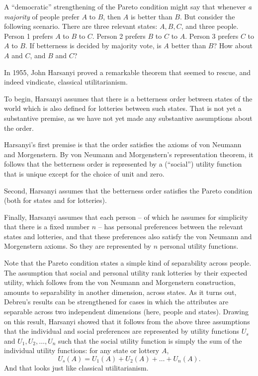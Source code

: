 \begin{exercise}
  A ``democratic'' strengthening of the Pareto condition might say
  that whenever \emph{a majority} of people prefer $A$ to $B$, then
  $A$ is better than $B$. But consider the following scenario. There
  are three relevant states: $A,B,C$, and three people. Person 1
  prefers $A$ to $B$ to $C$. Person 2 prefers $B$ to $C$ to
  $A$. Person 3 prefers $C$ to $A$ to $B$. If betterness is decided by
  majority vote, is $A$ better than $B$? How about $A$ and $C$, and
  $B$ and $C$?
\end{exercise}

In 1955, John Harsanyi proved a remarkable theorem that seemed to
rescue, and indeed vindicate, classical utilitarianism. 

To begin, Harsanyi assumes that there is a betterness order
between states of the world which is also defined for lotteries between
such states. That is not yet a substantive premise, as we have not yet
made any substantive assumptions about the order. 

Harsanyi's first premise is that the order satisfies the axioms of von
Neumann and Morgenstern. By von Neumann and Morgenstern's
representation theorem, it follows that the betterness order is
represented by a (``social'') utility function that is unique except
for the choice of unit and zero.

Second, Harsanyi assumes that the betterness order satisfies the
Pareto condition (both for states and for lotteries).

Finally, Harsanyi assumes that each person -- of which he assumes for
simplicity that there is a fixed number $n$ -- has personal
preferences between the relevant states and lotteries, and that these
preferences also satisfy the von Neumann and Morgenstern axioms. So
they are represented by $n$ personal utility functions.

Note that the Pareto condition states a simple kind of separability
across people. The assumption that social and personal utility rank
lotteries by their expected utility, which follows from the von
Neumann and Morgenstern construction, amounts to separability in
another dimension, across states. As it turns out, Debreu's results
can be strengthened for cases in which the attributes are separable
across two independent dimensions (here, people and states). Drawing
on this result, Harsanyi showed that it follows from the above three
assumptions that the individual and social preferences are represented
by utility functions $U_s$ and $U_1,U_2,\ldots,U_n$ such that the
social utility function is simply the sum of the individual utility
functions: for any state or lottery $A$,
\[
  U_s(A) = U_1(A) + U_2(A) + \ldots + U_n(A).
\]
And that looks just like classical utilitarianism.

